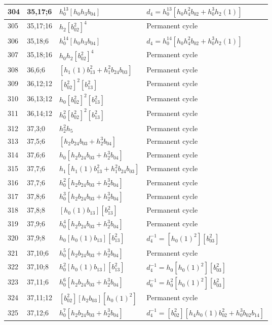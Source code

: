 \documentclass{article}
\begin{document}
\begin{longtable}{|l|l|>{\raggedright\arraybackslash}p{6cm}|>{\raggedright\arraybackslash}p{6cm}|}
\hline
304 & 35,17;6 & $h_0^{13}[h_0h_3b_{04}]$ &$d_{4}=h_0^{13}[h_0h_4^2b_{02} + h_0^3h_2(1)]$\\
\hline
305 & 35,17;16 & $h_2[b_{02}^2]^4$ & Permanent cycle\\
\hline
306 & 35,18;6 & $h_0^{14}[h_0h_3b_{04}]$ &$d_{4}=h_0^{14}[h_0h_4^2b_{02} + h_0^3h_2(1)]$\\
\hline
307 & 35,18;16 & $h_0h_2[b_{02}^2]^4$ & Permanent cycle\\
\hline
308 & 36,6;6 & $[h_1(1)b_{13}^2 + h_1^2b_{24}b_{03}]$ & Permanent cycle\\
\hline
309 & 36,12;12 & $[b_{02}^2]^2[b_{13}^2]$ & Permanent cycle\\
\hline
310 & 36,13;12 & $h_0[b_{02}^2]^2[b_{13}^2]$ & Permanent cycle\\
\hline
311 & 36,14;12 & $h_0^2[b_{02}^2]^2[b_{13}^2]$ & Permanent cycle\\
\hline
312 & 37,3;0 & $h_2^2h_5$ & Permanent cycle\\
\hline
313 & 37,5;6 & $[h_2b_{24}b_{03} + h_2^3b_{04}]$ & Permanent cycle\\
\hline
314 & 37,6;6 & $h_0[h_2b_{24}b_{03} + h_2^3b_{04}]$ & Permanent cycle\\
\hline
315 & 37,7;6 & $h_1[h_1(1)b_{13}^2 + h_1^2b_{24}b_{03}]$ & Permanent cycle\\
316 & 37,7;6 & $h_0^2[h_2b_{24}b_{03} + h_2^3b_{04}]$ & Permanent cycle\\
\hline
317 & 37,8;6 & $h_0^3[h_2b_{24}b_{03} + h_2^3b_{04}]$ & Permanent cycle\\
\hline
318 & 37,8;8 & $[h_0(1)b_{13}][b_{13}^2]$ & Permanent cycle\\
\hline
319 & 37,9;6 & $h_0^4[h_2b_{24}b_{03} + h_2^3b_{04}]$ & Permanent cycle\\
\hline
320 & 37,9;8 & $h_0[h_0(1)b_{13}][b_{13}^2]$ & $d_{4}^{-1}=[h_0(1)^2][b_{03}^2]$\\
\hline
321 & 37,10;6 & $h_0^5[h_2b_{24}b_{03} + h_2^3b_{04}]$ & Permanent cycle\\
\hline
322 & 37,10;8 & $h_0^2[h_0(1)b_{13}][b_{13}^2]$ & $d_{4}^{-1}=h_0[h_0(1)^2][b_{03}^2]$\\
\hline
323 & 37,11;6 & $h_0^6[h_2b_{24}b_{03} + h_2^3b_{04}]$ & $d_{6}^{-1}=h_0^2[h_0(1)^2][b_{03}^2]$\\
\hline
324 & 37,11;12 & $[b_{02}^2][h_2b_{03}][h_0(1)^2]$ & Permanent cycle\\
\hline
325 & 37,12;6 & $h_0^7[h_2b_{24}b_{03} + h_2^3b_{04}]$ & $d_{4}^{-1}=[b_{02}^2][h_4h_0(1)b_{02}^2 + h_0^3b_{02}b_{14}]$\\

\end{longtable}
\end{document}
